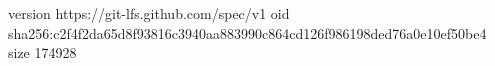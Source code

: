 version https://git-lfs.github.com/spec/v1
oid sha256:c2f4f2da65d8f93816c3940aa883990c864cd126f986198ded76a0e10ef50be4
size 174928
